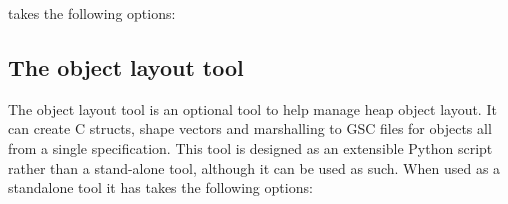 \gvmtxc{} takes the following options:




\subsection{The object layout tool\label{sect:objects}}

The object layout tool is an optional tool to help manage heap object layout. It can create C structs, shape vectors and marshalling to GSC files for objects all from a single specification.
This tool is designed as an extensible Python script rather than a stand-alone tool, although it can be used as such.
When used as a standalone tool it has takes the following options:


